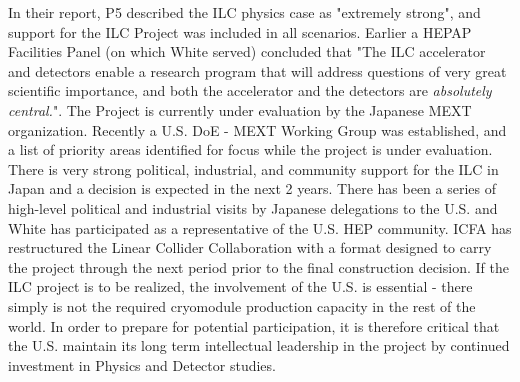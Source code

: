 In their report, P5 described the ILC physics case as "extremely strong", and support for the ILC Project was included
in all scenarios. Earlier a HEPAP Facilities Panel (on which White served) concluded that "The ILC accelerator and detectors 
enable a research program that will address questions of very great scientific importance, and both the accelerator and the detectors 
are {\it absolutely central.}". The Project is currently under evaluation by the Japanese MEXT organization. Recently a 
U.S. DoE - MEXT Working Group was established, and a list of priority areas identified for focus while the project is under evaluation.
There is very strong political, industrial, and community support for the ILC in Japan and a decision is expected in the next
2 years. There has been a series of high-level political and industrial visits by Japanese delegations to the U.S. and White 
has participated as a representative of the U.S. HEP community. ICFA has restructured the Linear Collider Collaboration with
a format designed to carry the project through the next period prior to the final construction decision. If the ILC project is
to be realized, the involvement of the U.S. is essential - there simply is not the required cryomodule production capacity in the rest
of the world. In order to prepare for potential participation, it is therefore critical that the U.S. maintain its long term intellectual
leadership in the project by continued investment in Physics and Detector studies.


